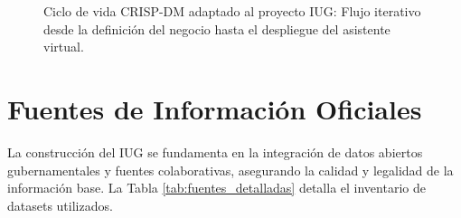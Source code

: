 \documentclass[12pt, a4paper, twoside, openright]{report}
\theoremstyle{plain}
\theoremstyle{definition}
\newcommand{\IUG}{IUG}             %
\begin{document}
\begin{figure}[htbp]
{%
}
\caption{Ciclo de vida CRISP-DM adaptado al proyecto IUG: Flujo iterativo desde la definición del negocio hasta el despliegue del asistente virtual.}
\label{fig:crispdm}
\end{figure}

\section{Fuentes de Información Oficiales}

La construcción del \IUG{} se fundamenta en la integración de datos abiertos gubernamentales y fuentes colaborativas, asegurando la calidad y legalidad de la información base. La Tabla \ref{tab:fuentes_detalladas} detalla el inventario de datasets utilizados.
\end{document}

